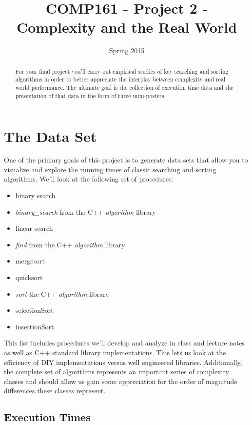 \documentclass[]{tufte-handout}
\title{COMP161 - Project 2 - Complexity and the Real World}
\author{}
\date{Spring 2015}
\begin{document}
\maketitle

\begin{abstract}
For your final project you'll carry out empirical studies of key searching and sorting algorithms in order to better appreciate the interplay between complexity and real world performance. The ultimate goal is the collection of execution time data and the presentation of that data in the form of three mini-posters. 
\end{abstract}

\section{The Data Set}

One of the primary goals of this project is to generate data sets that allow you to visualize and explore the running times of classic searching and sorting algorithms. We'll look at the following set of procedures: 
\begin{itemize}
\item binary search 
\item  \textit{binary\_search} from the C++ \textit{algorithm} library 
\item linear search 
\item  \textit{find} from the C++ \textit{algorithm} library
\item mergesort 
\item quicksort 
\item \textit{sort} the C++ \textit{algorithm} library 
\item selectionSort 
\item insertionSort 
\end{itemize}
This list includes procedures we'll develop and analyze in class and lecture notes as well as C++ standard library implementations. This lets us look at the efficiency of DIY implementations versus well engineered libraries. Additionally, the complete set of algorithms represents an important series of complexity classes and should allow us gain some appreciation for the order of magnitude differences these classes represent. 

\subsection{Execution Times}
\end{document}
